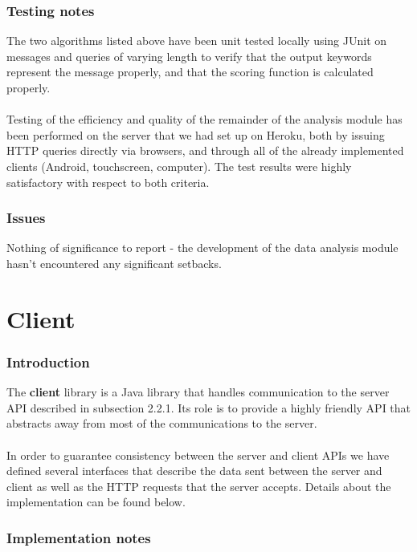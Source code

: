 \documentclass[12p, a4paper, onecolumn]{report}
\begin{document}
\subsubsection{Testing notes}

The two algorithms listed above have been unit tested locally using JUnit on messages and queries of varying length to verify that the output keywords represent the message properly, and that the scoring function is calculated properly. \\ \\
Testing of the efficiency and quality of the remainder of the analysis module has been performed on the server that we had set up on Heroku, both by issuing HTTP queries directly via browsers, and through all of the already implemented clients (Android, touchscreen, computer). The test results were highly satisfactory with respect to both criteria.

\subsubsection{Issues}

Nothing of significance to report - the development of the data analysis module hasn't encountered any significant setbacks.

\section{Client}

\subsubsection{Introduction}

The \textbf{client} library is a Java library that handles communication to the server API described in subsection 2.2.1. Its role is to provide a highly friendly API that abstracts away from most of the communications to the server. \\ \\ 
In order to guarantee consistency between the server and client APIs we have defined several interfaces that describe the data sent between the server and client as well as the HTTP requests that the server accepts. Details about the implementation can be found below. 

\subsubsection{Implementation notes}
\end{document}
